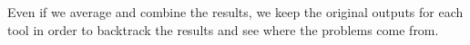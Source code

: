 

Even if we average and combine the results, we keep the original outputs for each tool in order to backtrack the results and see where the problems come from.








